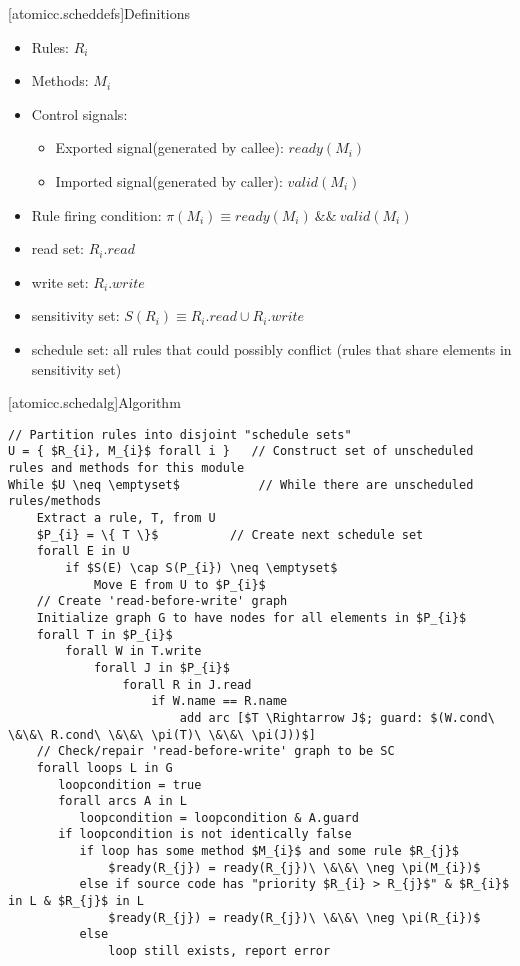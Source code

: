 [atomicc.scheddefs]{Definitions}
\begin{itemize}
\item Rules: $R_{i}$
\item Methods: $M_{i}$
\item Control signals:
\begin {itemize}
\item Exported signal(generated by callee):  $ready(M_{i})$
\item Imported signal(generated by caller):  $valid(M_{i})$
\end{itemize}
\item Rule firing condition: $\pi(M_{i}) \equiv ready(M_{i})\ \&\&\ valid(M_{i})$
\item read set: $R_{i}.read$
\item write set: $R_{i}.write$
\item sensitivity set: $S(R_{i}) \equiv R_{i}.read \cup R_{i}.write$
\item schedule set: all rules that could possibly conflict (rules that share elements in sensitivity set)
\end{itemize}

[atomicc.schedalg]{Algorithm}

\begin{lstlisting}[mathescape=true]
// Partition rules into disjoint "schedule sets"
U = { $R_{i}, M_{i}$ forall i }   // Construct set of unscheduled rules and methods for this module
While $U \neq \emptyset$           // While there are unscheduled rules/methods
    Extract a rule, T, from U
    $P_{i} = \{ T \}$          // Create next schedule set
    forall E in U
        if $S(E) \cap S(P_{i}) \neq \emptyset$
            Move E from U to $P_{i}$
    // Create 'read-before-write' graph
    Initialize graph G to have nodes for all elements in $P_{i}$
    forall T in $P_{i}$
        forall W in T.write
            forall J in $P_{i}$
                forall R in J.read
                    if W.name == R.name
                        add arc [$T \Rightarrow J$; guard: $(W.cond\ \&\&\ R.cond\ \&\&\ \pi(T)\ \&\&\ \pi(J))$]
    // Check/repair 'read-before-write' graph to be SC
    forall loops L in G
       loopcondition = true
       forall arcs A in L 
          loopcondition = loopcondition & A.guard
       if loopcondition is not identically false
          if loop has some method $M_{i}$ and some rule $R_{j}$
              $ready(R_{j}) = ready(R_{j})\ \&\&\ \neg \pi(M_{i})$
          else if source code has "priority $R_{i} > R_{j}$" & $R_{i}$ in L & $R_{j}$ in L
              $ready(R_{j}) = ready(R_{j})\ \&\&\ \neg \pi(R_{i})$
          else
              loop still exists, report error
\end{lstlisting}

